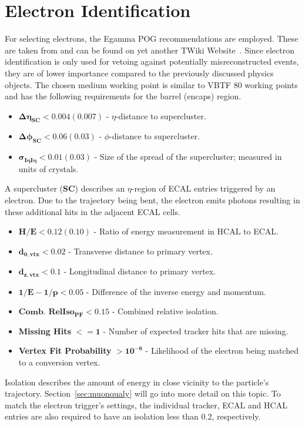 \section{Electron Identification}
\label{sec:eleid}

For selecting electrons, the Egamma POG recommendations are employed. These are taken from and can be found on yet another TWiki Website~\cite{egammaid}. Since electron identification is only used for vetoing against potentially misreconstructed events, they are of lower importance compared to the previously discussed physics objects. The chosen medium working point is similar to VBTF 80 working points and has the following requirements for the barrel (encaps) region. 


\begin{itemize}
\item $\mathbf{\Delta \eta_{\textbf{SC}} < 0.004 (0.007)}$ - $\eta$-distance to supercluster.
\item $\mathbf{\Delta \phi_{\textbf{SC}} < 0.06 (0.03)}$ - $\phi$-distance to supercluster.
\item $\mathbf{\sigma_{I\eta I\eta} < 0.01 (0.03)}$ - Size of the spread of the supercluster; measured in units of crystals.
\end{itemize}

A supercluster (\textbf{SC}) describes an $\eta$-region of ECAL entries triggered by an electron. Due to the trajectory being bent, the electron emits photons resulting in these additional hits in the adjacent ECAL cells.

\begin{itemize}
\item $\mathbf{H / E < 0.12 (0.10)}$ - Ratio of energy measurement in HCAL to ECAL.
\item $\mathbf{d_{0, \textbf{vtx}} < 0.02}$ - Transverse distance to primary vertex. 
\item $\mathbf{d_{z, \textbf{vtx}} < 0.1}$ - Longitudinal distance to primary vertex.
\item $\mathbf{1/E - 1/p < 0.05}$ - Difference of the inverse energy and momentum.
\item $\mathbf{\textbf{Comb. RelIso}_{\textbf{PF}} < 0.15}$ - Combined relative isolation.
\item \textbf{Missing Hits} $\mathbf{<= 1}$ - Number of expected tracker hits that are missing.
\item \textbf{Vertex Fit Probability} $\mathbf{> 10^{-6}}$ - Likelihood of the electron being matched to a conversion vertex.
\end{itemize}

Isolation describes the amount of energy in close vicinity to the particle's trajectory. Section~\ref{sec:muonqualy} will go into more detail on this topic. To match the electron trigger's settings, the individual tracker, ECAL and HCAL entries are also required to have an isolation less than 0.2, respectively.

